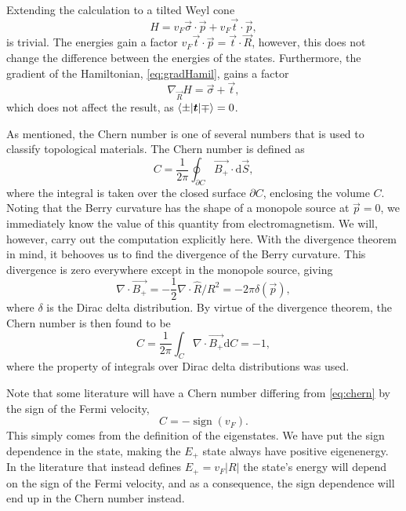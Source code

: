 Extending the calculation to a tilted Weyl cone
\begin{equation}
  H = v_F \vec{\sigma} \cdot \vec{p} + v_F \vec{t} \cdot \vec{p},
\end{equation}
is trivial.
The energies gain a factor \( v_F \vec{t}\cdot \vec{p} = \vec{t} \cdot \vec{R}\), however, this does not change the difference between the energies of the states.
Furthermore, the gradient of the Hamiltonian, \cref{eq:gradHamil}, gains a factor
\begin{equation}
  \nabla_{\vec{R}} H = \vec\sigma + \vec{t},
\end{equation}
which does not affect the result, as \( \braket{\pm | \bm{t} | \mp} = 0 \).

As mentioned, the Chern number is one of several numbers that is used to classify topological materials.
The Chern number is defined as
\begin{equation}
  C = \frac{1}{2\pi} \oint_{\partial C} \vec{B_+} \cdot \mathrm{d}\vec{S},
\end{equation}
where the integral is taken over the closed surface $\partial C$, enclosing the volume $C$.
Noting that the Berry curvature has the shape of a monopole source at $\vec{p} = 0$, we immediately know the value of this quantity from electromagnetism.
We will, however, carry out the computation explicitly here.
With the divergence theorem in mind, it behooves us to find the divergence of the Berry curvature.
This divergence is zero everywhere except in the monopole source, giving
\begin{equation}
  \nabla \cdot \vec{B_+} = -\frac12 \nabla \cdot \hat{R} / R^2 = -2 \pi \delta(\vec{p}),
\end{equation}
where $\delta$ is the Dirac delta distribution.
By virtue of the divergence theorem, the Chern number is then found to be
\begin{equation}\label{eq:chern}
  C = \frac{1}{2\pi} \int_C \nabla \cdot \vec{B_+} \mathrm{d} C = -1,
\end{equation}
where the property of integrals over Dirac delta distributions was used.

Note that some literature will have a Chern number differing from \eqref{eq:chern} by the sign of the Fermi velocity,
\begin{equation}
  C = - \operatorname{sign}(v_F).
\end{equation}
This simply comes from the definition of the eigenstates.
We have put the sign dependence in the state, making the $E_+$ state always have positive eigenenergy.
In the literature that instead defines $E_+ = v_F |R|$ the state's energy will depend on the sign of the Fermi velocity, and as a consequence, the sign dependence will end up in the Chern number instead.

